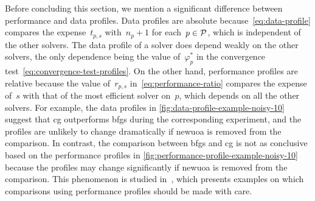 Before concluding this section, we mention a significant difference between performance and data profiles.
Data profiles are absolute because~\cref{eq:data-profile} compares the expense~$t_{p, s}$ with~$n_p + 1$ for each~$p \in \mathcal{P}$, which is independent of the other solvers.
The data profile of a solver does depend weakly on the other solvers, the only dependence being the value of~$\varphi_p^{\ast}$ in the convergence test~\cref{eq:convergence-test-profiles}.
On the other hand, performance profiles are relative because the value of~$r_{p, s}$ in~\cref{eq:performance-ratio} compares the expense of~$s$ with that of the most efficient solver on~$p$, which depends on all the other solvers. 
For example, the data profiles in \cref{fig:data-profile-example-noisy-10} suggest that \gls{cg} outperforms \gls{bfgs} during the corresponding experiment, and the profiles are unlikely to change dramatically if \gls{newuoa} is removed from the comparison.
In contrast, the comparison between \gls{bfgs} and \gls{cg} is not as conclusive based on the performance profiles in \cref{fig:performance-profile-example-noisy-10} because the profiles may change significantly if \gls{newuoa} is removed from the comparison.
This phenomenon is studied in~\cite{Gould_Scott_2016}, which presents examples on which comparisons using performance profiles should be made with care.

